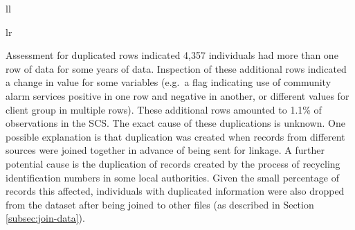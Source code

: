 \documentclass[12pt,a4paper,oneside,table]{report}
\begin{document}
\begin{tabular}[t]{ll}
\begin{tabular}{lr}
{Assessment for duplicated rows indicated 4,357 individuals had more than
one row of data for some years of data. Inspection of these additional
rows indicated a change in value for some variables (e.g.~a flag
indicating use of community alarm services positive in one row and
negative in another, or different values for client group in multiple
rows). These additional rows amounted to 1.1\% of observations in the
SCS. The exact cause of these duplications is unknown. One possible
explanation is that duplication was created when records from different
sources were joined together in advance of being sent for linkage. A
further potential cause is the duplication of records created by the
process of recycling identification numbers in some local authorities.
Given the small percentage of records this affected, individuals with
duplicated information were also dropped from the dataset after being
joined to other files (as described in Section \ref{subsec:join-data}).

\begin{table}[]
\centering
{}
\caption{Social Care Survey file variables}
\label{tab:scs-vars}
\end{table}
\FloatBarrier

}
\end{tabular}
\end{tabular}
\end{document}
